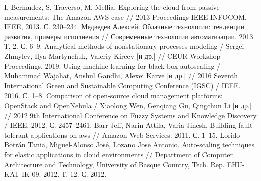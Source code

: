 \begin{thebibliography}{40}
I. Bermudez, S. Traverso, M. Mellia. Exploring the cloud from passive measurements: The Amazon AWS case // 2013 Proceedings IEEE INFOCOM. IEEE, 2013. С. 230–234.
Медведев Алексей. Облачные технологии: тенденции развития, примеры исполнения // Современные технологии автоматизации. 2013. Т. 2. С. 6–9.
Analytical methods of nonstationary processes modeling / Sergei Zhmylev, Ilya Martynchuk, Valeriy Kireev [и др.] // CEUR Workshop Proceedings. 2019.
Using machine learning for black-box autoscaling / Muhammad Wajahat, Anshul Gandhi, Alexei Karve [и др.] // 2016 Seventh International Green and Sustainable Computing Conference (IGSC) / IEEE. 2016. С. 1–8.
Comparison of open-source cloud management platforms: OpenStack and OpenNebula / Xiaolong Wen, Genqiang Gu, Qingchun Li [и др.] // 2012 9th International Conference on Fuzzy Systems and Knowledge Discovery / IEEE. 2012. С. 2457–2461.
Barr Jeff, Narin Attila, Varia Jinesh. Building fault-tolerant applications on aws // Amazon Web Services. 2011. С. 1–15.
Lorido-Botrán Tania, Miguel-Alonso José, Lozano Jose Antonio. Auto-scaling techniques for elastic applications in cloud environments // Department of Computer Architecture and Technology, University of Basque Country, Tech. Rep. EHU-KAT-IK-09. 2012. Т. 12. С. 2012.
\end{thebibliography}
\endgroup